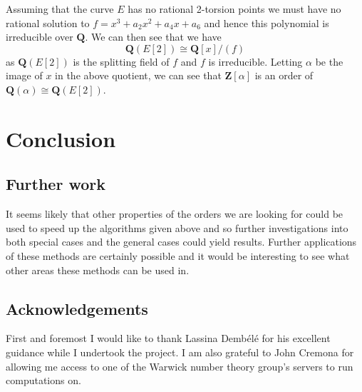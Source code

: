 \documentclass[a4paper,abstracton,bibtotoc]{scrreprt}
\theoremstyle{definition}
\newcommand{\QQ}{\mathbf{Q}}
\newcommand{\ZZ}{\mathbf{Z}}
\begin{document}
\minisec{}
Assuming that the curve $E$ has no rational 2-torsion points we must have no rational solution to $f = x^3 + a_2x^2 + a_4x + a_6$ and hence this polynomial is irreducible over $\QQ$.
We can then see that we have
\[
\QQ(E[2]) \cong \QQ[x]/(f)
\]
as $\QQ(E[2])$ is the splitting field of $f$ and $f$ is irreducible.
Letting $\alpha$ be the image of $x$ in the above quotient, we can see that $ \ZZ[\alpha]$ is an order of $\QQ(\alpha)\cong \QQ(E[2])$.


\chapter{Conclusion}

\section{Further work}
It seems likely that other properties of the orders we are looking for could be used to speed up the algorithms given above and so further investigations into both special cases and the general cases could yield results.
Further applications of these methods are certainly possible and it would be interesting to see what other areas these methods can be used in.


\section{Acknowledgements}
First and foremost I would like to thank Lassina Demb\'el\'e for his excellent guidance while I undertook the project.
I am also grateful to John Cremona for allowing me access to one of the Warwick number theory group's servers to run computations on.


 
%

%

\nocite{*}


\end{document}
